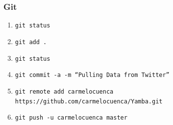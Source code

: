 \begin{frame}[fragile]
\frametitle{Git}
\begin{enumerate}
\item \texttt{git status}
\item \texttt{git add .}
\item \texttt{git status}
\item \texttt{git commit -a -m ``Pulling Data from Twitter''}
\item \texttt{git remote add carmelocuenca https://github.com/carmelocuenca/Yamba.git}
\item \texttt{git push -u carmelocuenca master}
\end{enumerate}

\end{frame}
